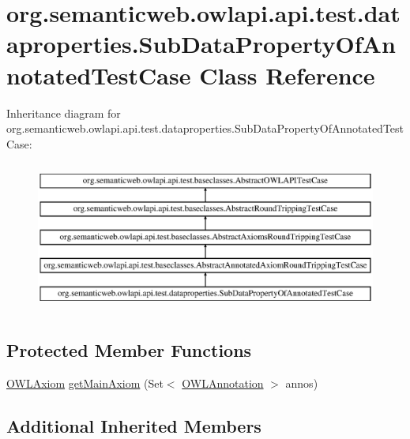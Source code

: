 \hypertarget{classorg_1_1semanticweb_1_1owlapi_1_1api_1_1test_1_1dataproperties_1_1_sub_data_property_of_annotated_test_case}{\section{org.\-semanticweb.\-owlapi.\-api.\-test.\-dataproperties.\-Sub\-Data\-Property\-Of\-Annotated\-Test\-Case Class Reference}
\label{classorg_1_1semanticweb_1_1owlapi_1_1api_1_1test_1_1dataproperties_1_1_sub_data_property_of_annotated_test_case}
}
Inheritance diagram for org.\-semanticweb.\-owlapi.\-api.\-test.\-dataproperties.\-Sub\-Data\-Property\-Of\-Annotated\-Test\-Case\-:\begin{figure}[H]
\begin{center}
\leavevmode
\includegraphics[height=5.000000cm]{classorg_1_1semanticweb_1_1owlapi_1_1api_1_1test_1_1dataproperties_1_1_sub_data_property_of_annotated_test_case}
\end{center}
\end{figure}
\subsection*{Protected Member Functions}
\begin{DoxyCompactItemize}
\item 
\hyperlink{interfaceorg_1_1semanticweb_1_1owlapi_1_1model_1_1_o_w_l_axiom}{O\-W\-L\-Axiom} \hyperlink{classorg_1_1semanticweb_1_1owlapi_1_1api_1_1test_1_1dataproperties_1_1_sub_data_property_of_annotated_test_case_ab450245b417d5cd2a60de658f89366eb}{get\-Main\-Axiom} (Set$<$ \hyperlink{interfaceorg_1_1semanticweb_1_1owlapi_1_1model_1_1_o_w_l_annotation}{O\-W\-L\-Annotation} $>$ annos)
\end{DoxyCompactItemize}
\subsection*{Additional Inherited Members}


